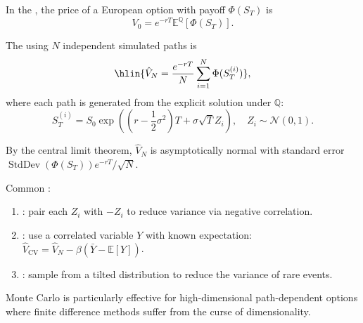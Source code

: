 \begin{definition} \label{definition:monte_carlo_simulation_for_option_pricing_with_variance_reduction}
In the , the price of a European option with payoff $\Phi(S_T)$ is
$$V_0 = e^{-rT} \mathbb{E}^{\mathbb{Q}}\left[\Phi(S_T)\right].$$

The  using $N$ independent simulated paths is
$$\hlin{\hat{V}_N = \frac{e^{-rT}}{N} \sum_{i=1}^N \Phi(S_T^{(i)})},$$
where each path is generated from the explicit solution under $\mathbb{Q}$:
$$S_T^{(i)} = S_0 \exp\left(\left(r - \frac{1}{2}\sigma^2\right)T + \sigma\sqrt{T} Z_i\right), \quad Z_i \sim \mathcal{N}(0, 1).$$

By the central limit theorem, $\hat{V}_N$ is asymptotically normal with standard error $\operatorname{StdDev}(\Phi(S_T)) e^{-rT}/\sqrt{N}$.

Common :

\begin{enumerate}
    \item {}: pair each $Z_i$ with $-Z_i$ to reduce variance via negative correlation.
    \item {}: use a correlated variable $Y$ with known expectation: $\hat{V}_{\text{CV}} = \hat{V}_N - \beta(\bar{Y} - \mathbb{E}[Y])$.
    \item {}: sample from a tilted distribution to reduce the variance of rare events.
\end{enumerate}

Monte Carlo is particularly effective for high-dimensional path-dependent options where finite difference methods suffer from the curse of dimensionality.
\end{definition}